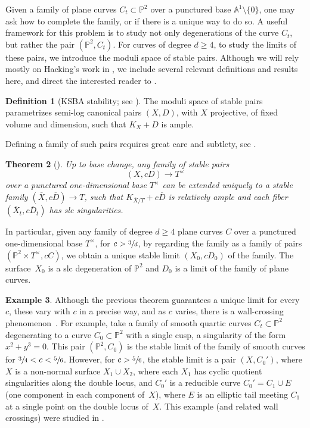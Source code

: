 \documentclass[JEP,XML,SOM,Unicode,NoFloatCountersInSection,published]{cedram}
\theoremstyle{plain}
\newtheorem{theorem}{Theorem}[section]
\theoremstyle{definition}
\newtheorem{example}[theorem]{Example}
\newtheorem{definition}[theorem]{Definition}
\renewcommand\AA{{\mathbb A}}
\newcommand\PP{{\mathbb{P}}}
\begin{document}
Given a family of plane curves $C_t \subset \PP^2$ over a punctured base $\AA^1 \setminus \{ 0 \}$, one may ask how to complete the family, or if there is a unique way to do so. A useful framework for this problem is to study not only degenerations of the curve $C_t$, but rather the pair $(\PP^2, C_t)$. For curves of degree $d \ge 4$, to study the limits of these pairs, we introduce the moduli space of stable pairs. Although we will rely mostly on Hacking's work in \cite{Hacking}, we include several relevant definitions and results here, and direct the interested reader to \cite{KollarModuliBook}.

\begin{definition}[{KSBA stability; see \cite[Def.\, 8.6, 8.7]{KollarModuliBook}}]
The moduli space of stable pairs parametrizes semi-log canonical pairs $(X,D)$, with $X$ projective, of fixed volume and dimension, such that $K_X + D$ is ample.
\end{definition}

Defining a family of such pairs requires great care and subtlety, see \cite[Ch.\,7, 8]{KollarModuliBook}.

\begin{theorem}[{\cite[Th.\,8.9(2)]{KollarModuliBook}}]\label{stablelimit}
Up to base change, any family of stable pairs
\[
(X, cD) \to T^\times
\]
over a punctured one-dimensional base $T^\times$ can be extended uniquely to a stable family $(\overline{X}, c \overline{D}) \to T$, such that $K_{\overline{X}/T} + c \overline{D}$ is relatively ample and each fiber $(\overline{X}_t, c \overline{D}_t)$ has slc singularities.
\end{theorem}

In particular, given any family of degree $d \ge 4$ plane curves $C$ over a punctured one-dimensional base $T^\times$, for $c > \sfrac{3}{d}$, by regarding the family as a family of pairs $(\PP^2 \times T^\times, cC)$, we obtain a unique stable limit $(X_0,cD_0)$ of the family. The surface~$X_0$ is a slc degeneration of $\PP^2$ and $D_0$ is a limit of the family of plane curves.

\begin{example}
Although the previous theorem guarantees a unique limit for every~$c$, these vary with $c$ in a precise way, and as $c$ varies, there is a wall-crossing phenomenon~\cite{KSBwallcrossing}. For example, take a family of smooth quartic curves $C_t \subset \PP^2$ degenerating to a curve $C_0 \subset \PP^2$ with a single cusp, a singularity of the form $x^2 + y^3 = 0$. This pair $(\PP^2, C_0)$ is the stable limit of the family of smooth curves for $\sfrac{3}{4} < c < \sfrac{5}{6}$. However, for $c > \sfrac{5}{6}$, the stable limit is a pair $(X,C_0')$, where $X$ is a non-normal surface $X_1 \cup X_2$, where each $X_1$ has cyclic quotient singularities along the double locus, and $C_0'$ is a reducible curve $C_0' = C_1 \cup E$ (one component in each component of~$X$), where $E$ is an elliptic tail meeting $C_1$ at a single point on the double locus of~$X$. This example (and related wall crossings) were studied in \cite{Hassett}.
\end{example}
\end{document}
